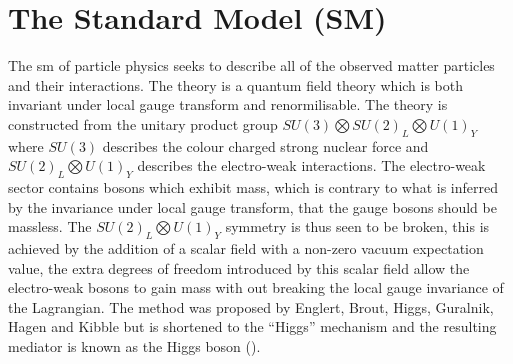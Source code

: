 \section{The Standard Model (SM)} %
\label{sec:the_standard_model_sm_}

The \ac{sm} of particle physics 
\cite{Glashow1961579,PhysRevLett.19.1264,tHooft1972189} seeks to describe all 
of the observed matter particles and their interactions. The theory is a 
quantum field theory which is both invariant under local gauge transform and 
renormilisable. The theory is constructed from the unitary product group 
$SU(3)\bigotimes SU(2)_{L} \bigotimes U(1)_{Y}$ where $SU(3)$ describes the 
colour charged strong nuclear force and $SU(2)_{L} \bigotimes U(1)_{Y}$ 
describes the electro-weak interactions. The electro-weak sector contains 
bosons which exhibit mass, which is contrary to what is inferred by the 
invariance under local gauge transform, that the gauge bosons should be 
massless. The $SU(2)_{L} \bigotimes U(1)_{Y}$ symmetry is thus seen to be 
broken, this is achieved by the addition of a scalar field with a non-zero 
vacuum expectation value, the extra degrees of freedom introduced by this 
scalar field allow the electro-weak bosons to gain mass with out breaking the 
local gauge invariance of the Lagrangian. The method was proposed by Englert, 
Brout, Higgs, Guralnik, Hagen and Kibble 
\cite{tHooft1972189,PhysRevLett.13.321,Higgs1964132,PhysRevLett.13.508,PhysRevLett.13.585,PhysRev.145.1156,PhysRev.155.1554} but 
is shortened to the ``Higgs'' mechanism and the resulting mediator is known as 
the Higgs boson (\PHiggs).

